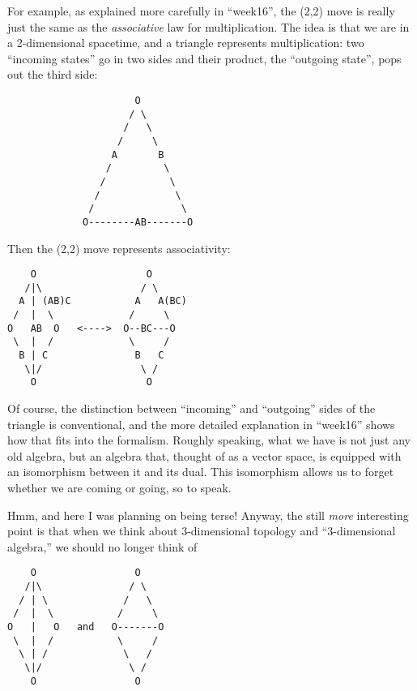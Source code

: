 \documentclass{article}
\begin{document}
For example, as explained more carefully in ``week16'', the (2,2) move
is really just the same as the \emph{associative} law for
multiplication. The idea is that we are in a 2-dimensional spacetime,
and a triangle represents multiplication: two ``incoming states'' go in
two sides and their product, the ``outgoing state'', pops out the third
side:

\begin{verbatim}
                      O
                     / \
                    /   \
                   /     \
                  A       B
                 /         \
                /           \
               /             \
              /               \
             O--------AB-------O
\end{verbatim}

Then the (2,2) move represents associativity:

\begin{verbatim}
    O                   O
   /|\                 / \
  A | (AB)C           A   A(BC)
 /  |  \             /     \
O   AB  O   <---->  O--BC---O
 \  |  /             \     /
  B | C               B   C
   \|/                 \ /
    O                   O
\end{verbatim}

Of course, the distinction between ``incoming'' and ``outgoing'' sides
of the triangle is conventional, and the more detailed explanation in
``week16'' shows how that fits into the formalism. Roughly speaking,
what we have is not just any old algebra, but an algebra that, thought
of as a vector space, is equipped with an isomorphism between it and its
dual. This isomorphism allows us to forget whether we are coming or
going, so to speak.

Hmm, and here I was planning on being terse! Anyway, the still
\emph{more} interesting point is that when we think about 3-dimensional
topology and ``3-dimensional algebra,'' we should no longer think of

\begin{verbatim}
    O                 O
   /|\               / \
  / | \             /   \
 /  |  \           /     \
O   |   O   and   O-------O
 \  |  /           \     /
  \ | /             \   /
   \|/               \ /
    O                 O
\end{verbatim}
\end{document}
